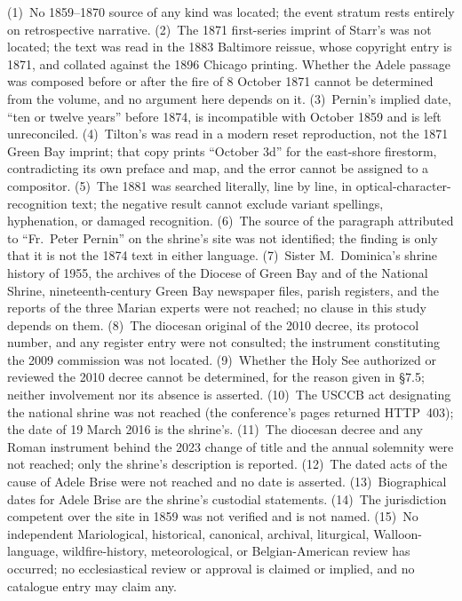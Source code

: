 (1)~No 1859--1870 source of any kind was located; the event stratum
rests entirely on retrospective narrative. (2)~The 1871 first-series
imprint of Starr's  was not located; the text was
read in the 1883 Baltimore reissue, whose copyright entry is 1871, and
collated against the 1896 Chicago printing. Whether the Adele passage
was composed before or after the fire of 8 October 1871 cannot be
determined from the volume, and no argument here depends on it.
(3)~Pernin's implied date, ``ten or twelve years'' before 1874, is
incompatible with October 1859 and is left unreconciled. (4)~Tilton's
 was read in a modern reset reproduction, not the 1871
Green Bay imprint; that copy prints ``October 3d'' for the east-shore
firestorm, contradicting its own preface and map, and the error cannot
be assigned to a compositor. (5)~The 1881  was searched literally, line by line, in
optical-character-recognition text; the negative result cannot exclude
variant spellings, hyphenation, or damaged recognition. (6)~The source
of the paragraph attributed to ``Fr.\ Peter Pernin'' on the shrine's
site was not identified; the finding is only that it is not the 1874
text in either language. (7)~Sister M.~Dominica's shrine history of
1955, the archives of the Diocese of Green Bay and of the National
Shrine, nineteenth-century Green Bay newspaper files, parish registers,
and the reports of the three Marian experts were not reached; no clause
in this study depends on them. (8)~The diocesan original of the 2010
decree, its protocol number, and any register entry were not consulted;
the instrument constituting the 2009 commission was not located.
(9)~Whether the Holy See authorized or reviewed the 2010 decree cannot
be determined, for the reason given in \S7.5; neither involvement nor
its absence is asserted. (10)~The USCCB act designating the national
shrine was not reached (the conference's pages returned HTTP~403);
the date of 19 March 2016 is the shrine's. (11)~The diocesan decree and
any Roman instrument behind the 2023 change of title and the annual
solemnity were not reached; only the shrine's description is reported.
(12)~The dated acts of the cause of Adele Brise were not reached and no
date is asserted. (13)~Biographical dates for Adele Brise are the
shrine's custodial statements. (14)~The jurisdiction competent over the
site in 1859 was not verified and is not named. (15)~No independent
Mariological, historical, canonical, archival, liturgical,
Walloon-language, wildfire-history, meteorological, or Belgian-American
review has occurred; no ecclesiastical review or approval is claimed or
implied, and no catalogue entry may claim any.

